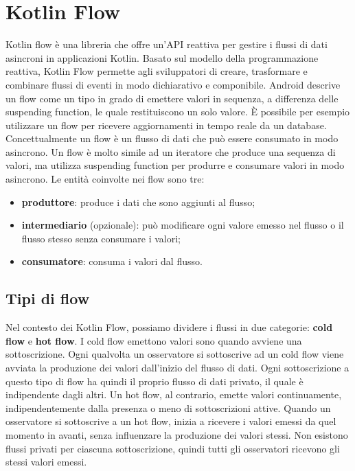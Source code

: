 \documentclass[12pt,a4paper,openright,twoside]{book}
\begin{document}
\section{Kotlin Flow}
Kotlin flow è una libreria che offre un'API reattiva per gestire i flussi di dati asincroni in applicazioni Kotlin. Basato sul modello della programmazione reattiva, Kotlin Flow permette agli sviluppatori di creare, trasformare e combinare flussi di eventi in modo dichiarativo e componibile.
Android descrive un flow come un tipo in grado di emettere valori in sequenza, a differenza delle suspending function, le quale restituiscono un solo valore. È possibile per esempio utilizzare un flow per ricevere aggiornamenti in tempo reale da un database. Concettualmente un flow è un flusso di dati che può essere consumato in modo asincrono. 
Un flow è molto simile ad un iteratore che produce una sequenza di valori, ma utilizza suspending function per produrre e consumare valori in modo asincrono. 
Le entità coinvolte nei flow sono tre: 
\begin{itemize}
    \item \textbf{produttore}: produce i dati che sono aggiunti al flusso; 
    \item \textbf{intermediario} (opzionale): può modificare ogni valore emesso nel flusso o il flusso stesso senza consumare i valori; 
    \item \textbf{consumatore}: consuma i valori dal flusso. 
\end{itemize}

\subsection{Tipi di flow}
Nel contesto dei Kotlin Flow, possiamo dividere i flussi in due categorie: \textbf{cold flow} e \textbf{hot flow}. 
I cold flow emettono valori sono quando avviene una sottoscrizione. Ogni qualvolta un osservatore si sottoscrive ad un cold flow viene avviata la produzione dei valori dall'inizio del flusso di dati. Ogni sottoscrizione a questo tipo di flow ha quindi il proprio flusso di dati privato, il quale è indipendente dagli altri. 
Un hot flow, al contrario, emette valori continuamente, indipendentemente dalla presenza o meno di sottoscrizioni attive. Quando un osservatore si sottoscrive a un hot flow, inizia a ricevere i valori emessi da quel momento in avanti, senza influenzare la produzione dei valori stessi. Non esistono flussi privati per ciascuna sottoscrizione, quindi tutti gli osservatori ricevono gli stessi valori emessi. 
\end{document}
